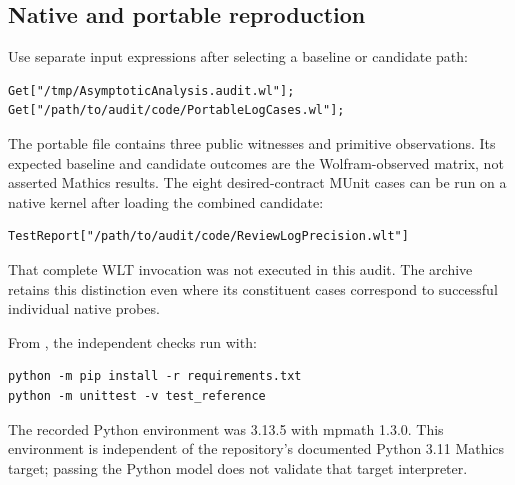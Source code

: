 \documentclass[11pt,letterpaper]{article}
\newcommand{\src}[1]{\texttt{\small\detokenize{#1}}}
\theoremstyle{remark}\newtheorem{remark}[proposition]{Remark}
\begin{document}
\subsection{Native and portable reproduction}
Use separate input expressions after selecting a baseline or candidate path:
\begin{lstlisting}
Get["/tmp/AsymptoticAnalysis.audit.wl"];
Get["/path/to/audit/code/PortableLogCases.wl"];
\end{lstlisting}
The portable file contains three public witnesses and primitive observations.
Its expected baseline and candidate outcomes are the Wolfram-observed matrix,
not asserted Mathics results. The eight desired-contract MUnit cases can be
run on a native kernel after loading the combined candidate:
\begin{lstlisting}
TestReport["/path/to/audit/code/ReviewLogPrecision.wlt"]
\end{lstlisting}
That complete WLT invocation was not executed in this audit. The archive
retains this distinction even where its constituent cases correspond to
successful individual native probes.

From \src{code/}, the independent checks run with:
\begin{lstlisting}
python -m pip install -r requirements.txt
python -m unittest -v test_reference
\end{lstlisting}
The recorded Python environment was 3.13.5 with mpmath 1.3.0. This environment
is independent of the repository's documented Python 3.11 Mathics target;
passing the Python model does not validate that target interpreter.
\end{document}
